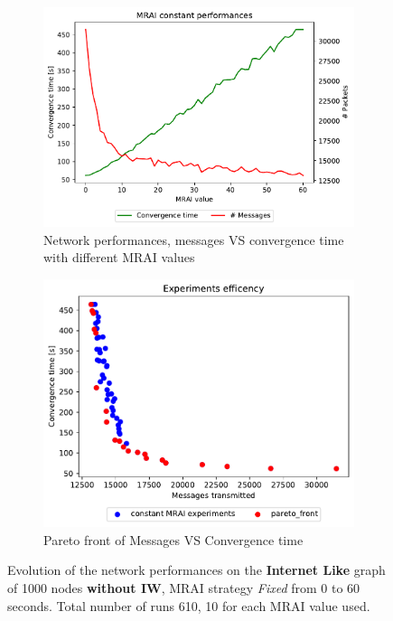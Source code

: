 \begin{figure}[h]
     \centering
     \begin{subfigure}[b]{0.503\textwidth}
         \centering
         \includegraphics[width=\textwidth]{images/internet_like/1000/constantMRAI/internet_like-constant-noIW_mrai_evolution.pdf}
		 \caption{Network performances, messages VS convergence time with different
			\ac{MRAI} values}
         \label{fig:internt_like_1000_constant_noIW_evolution_evolution}
     \end{subfigure}
     \hfill
     \begin{subfigure}[b]{0.477\textwidth}
         \centering
         \includegraphics[width=\textwidth]{images/internet_like/1000/constantMRAI/internet_like-constant-noIW.pdf}
		 \caption{Pareto front of Messages VS Convergence time}
         \label{fig:internt_like_1000_constant_noIW_evolution_paretoFront}
     \end{subfigure}
		\caption{Evolution of the network performances on the \textbf{Internet Like} graph
			of \num{1000} nodes \textbf{without \ac{IW}}, \ac{MRAI} strategy
			\textit{Fixed} from \num{0} to \num{60} seconds. Total number of
			runs \num{610}, \num{10} for each \ac{MRAI} value used.}
        \label{fig:internet_like_1000_constant_evolution_noIW}
\end{figure}


